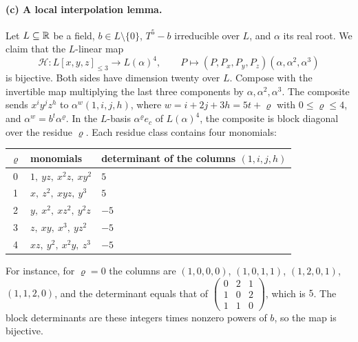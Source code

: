 \paragraph{(c) A local interpolation lemma.}
Let $L\subseteq\mathbb R$ be a field, $b\in L\setminus\{0\}$, $T^5-b$ irreducible
over $L$, and $\alpha$ its real root. We claim that the $L$-linear map
\[
 \mathcal H:L[x,y,z]_{\le3}\to L(\alpha)^4,\qquad
 P\mapsto(P,P_x,P_y,P_z)(\alpha,\alpha^2,\alpha^3)
\]
is bijective. Both sides have dimension twenty over $L$. Compose with the
invertible map multiplying the last three components by
$\alpha,\alpha^2,\alpha^3$. The composite sends $x^iy^jz^h$ to
$\alpha^w(1,i,j,h)$, where $w=i+2j+3h=5t+\varrho$ with $0\le\varrho\le4$,
and $\alpha^w=b^t\alpha^\varrho$. In the $L$-basis $\alpha^\varrho e_c$ of
$L(\alpha)^4$, the composite is block diagonal over the residue $\varrho$.
Each residue class contains four monomials:
\begin{center}\small
\begin{tabular}{cll}
$\varrho$ & monomials & determinant of the columns $(1,i,j,h)$\\\hline
0 & $1,\ yz,\ x^2z,\ xy^2$ & $5$\\
1 & $x,\ z^2,\ xyz,\ y^3$ & $5$\\
2 & $y,\ x^2,\ xz^2,\ y^2z$ & $-5$\\
3 & $z,\ xy,\ x^3,\ yz^2$ & $-5$\\
4 & $xz,\ y^2,\ x^2y,\ z^3$ & $-5$
\end{tabular}
\end{center}
For instance, for $\varrho=0$ the columns are $(1,0,0,0)$, $(1,0,1,1)$,
$(1,2,0,1)$, $(1,1,2,0)$, and the determinant equals that of
$\left(\begin{smallmatrix}0&2&1\\1&0&2\\1&1&0\end{smallmatrix}\right)$, which
is $5$. The block determinants are these integers times nonzero powers of
$b$, so the map is bijective.

